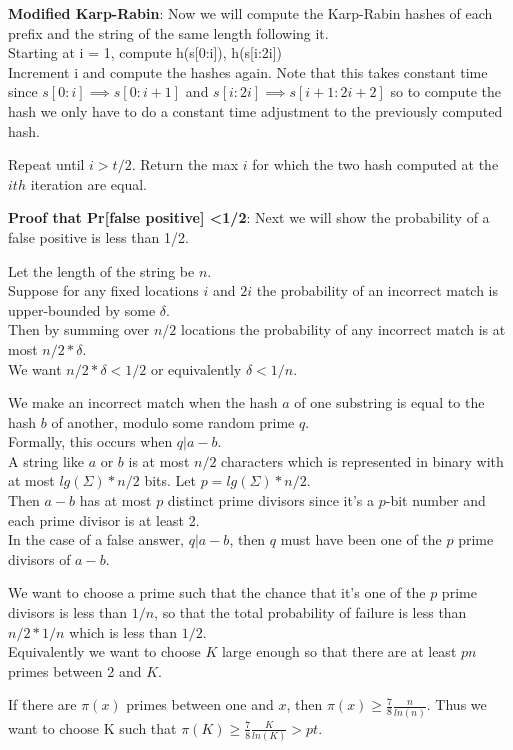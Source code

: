 \documentclass[11pt]{article}
\begin{document}
\textbf{Modified Karp-Rabin}:
Now we will compute the Karp-Rabin hashes of each prefix and the string of the same length following it.\\
Starting at i = 1, compute h(s[0:i]), h(s[i:2i])\\
Increment i and compute the hashes again. Note that this takes constant time since $s[0:i] \implies s[0:i+1]$ and $s[i:2i] \implies s[i+1:2i+2]$ so to compute the hash we only have to do a constant time adjustment to the previously computed hash.

Repeat until $i > t/2$. Return the max $i$ for which the two hash computed at the $ith$ iteration are equal.

\textbf{Proof that Pr[false positive] \textless 1/2}:
Next we will show the probability of a false positive is less than 1/2.

Let the length of the string be $n$. \\
Suppose for any fixed locations $i$ and $2i$ the probability of an incorrect match is upper-bounded by some $\delta$.\\
Then by summing over $n/2$ locations the probability of any incorrect match is at most $n/2 * \delta$.\\
We want $n/2 * \delta < 1/2$ or equivalently $\delta < 1/n$.

We make an incorrect match when the hash $a$ of one substring is equal to the hash $b$ of another, modulo some random prime $q$.\\
Formally, this occurs when $q | a-b$.\\
A string like $a$ or $b$ is at most $n/2$ characters which is represented in binary with at most $lg(\Sigma)* n/2$ bits. Let $p=lg(\Sigma) * n/2$.\\

Then $a-b$ has at most $p$ distinct prime divisors since it's a $p$-bit number and each prime divisor is at least 2.\\
In the case of a false answer, $q | a-b$, then $q$ must have been one of the $p$ prime divisors of $a-b$.

We want to choose a prime such that the chance that it's one of the $p$ prime divisors is less than $1/n$, so that the total probability of failure is less than $n/2 * 1/n$ which is less than $1/2$.\\
Equivalently we want to choose $K$ large enough so that there are at least $pn$ primes between 2 and $K$.

If there are $\pi(x)$ primes between one and $x$, then $\pi(x) \geq \frac{7}{8} \frac{n}{ln(n)}$.
Thus we want to choose K such that
$\pi(K) \geq \frac{7}{8} \frac{K}{ln(K)} > pt$.
\end{document}
